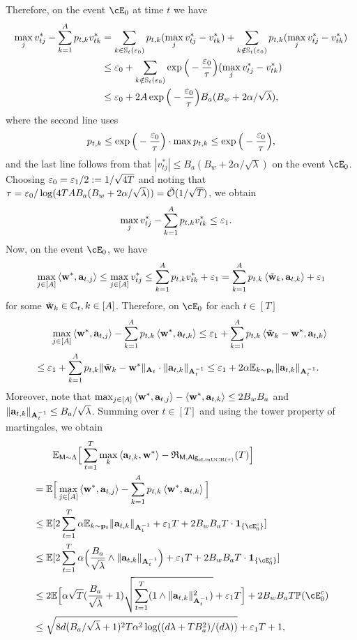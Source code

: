 Therefore, on the event $\cE_0$ at time $t$ we have
\begin{align*}
    \max_{j}v^*_{tj}-\sum_{k=1}^A p_{t,k}v^*_{tk}&= \sum_{k\in{\mathbb{S}}_t(\varepsilon_0)} p_{t,k}(\max_{j}v^*_{tj}-v^*_{tk})+\sum_{k\notin{\mathbb{S}}_t(\varepsilon_0)} p_{t,k}(\max_{j}v^*_{tj}-v^*_{tk})\\
    &\leq \varepsilon_0+\sum_{k\notin{\mathbb{S}}_t(\varepsilon_0)} \exp\Big(-\frac{\varepsilon_0}{{\tau}}\Big)(\max_{j}v^*_{tj}-v^*_{tk})\\
    &\leq \varepsilon_0+2A\exp\Big(-\frac{\varepsilon_0}{{\tau}}\Big)B_a(B_w+2\alpha/\sqrt{\lambda}),
\end{align*}
where the second line uses $$
p_{t,k}\leq\exp\Big(-\frac{\varepsilon_0}{{\tau}}\Big)\cdot\max{p_{t,k}}\leq \exp\Big(-\frac{\varepsilon_0}{{\tau}}\Big),
$$ and the  last line follows from that $|v^*_{tj}|\leq B_a(B_w+2\alpha/\sqrt{\lambda})$
 on the event $\cE_0$. Choosing $\varepsilon_0=\varepsilon_1/2:=1/\sqrt{4T}$ and noting that ${\tau}=\varepsilon_0/\log(4TA B_a(B_w+2\alpha/\sqrt{\lambda}))={\tilde{\mathcal O}}(1/\sqrt{T})$, we obtain
 \begin{align*}
    \max_{j}v^*_{tj}-\sum_{k=1}^A p_{t,k}v^*_{tk}&\leq\varepsilon_1.
\end{align*}
Now, on the event $\cE_0$, we have
\begin{align*}
    \max_{j\in[A]}\left\langle{\mathbf w}^*,{\mathbf a}_{t,j}\right\rangle\leq  \max_{j\in[A]}v^*_{tj}\leq \sum_{k=1}^A p_{t,k}v^*_{tk}+\varepsilon_1 =\sum_{k=1}^A p_{t,k}\left\langle\tilde{{\mathbf w}}_k,{\mathbf a}_{t,k}\right\rangle+\varepsilon_1
\end{align*}
for some $\tilde{{\mathbf w}}_k\in{\mathbb{C}}_t,k\in[A]$.
Therefore,  on $\cE_0$ for  each $t\in[T]$
\begin{align*}
    &~~\quad\max_{j\in[A]}\left\langle{\mathbf w}^*,{\mathbf a}_{t,j}\right\rangle-\sum_{k=1}^Ap_{t,k}\left\langle{\mathbf w}^*,{\mathbf a}_{t,k}\right\rangle
    \leq \varepsilon_1+ \sum_{k=1}^Ap_{t,k}\left\langle\tilde{{\mathbf w}}_k-{\mathbf w}^*,{\mathbf a}_{t,k}\right\rangle
    \\&\leq
    \varepsilon_1+\sum_{k=1}^Ap_{t,k}\|\tilde{{\mathbf w}}_k-{\mathbf w}^*\|_{{\mathbf A}_t}\cdot\|{\mathbf a}_{t,k}\|_{{\mathbf A}^{-1}_t}
    \leq \varepsilon_1+ 2\alpha\mathbb{E}_{k\sim {\mathbf p}_t}\|{\mathbf a}_{t,k}\|_{{\mathbf A}^{-1}_t}.
\end{align*}
 Moreover, note that $ \max_{j\in[A]}\left\langle{\mathbf w}^*,{\mathbf a}_{t,j}\right\rangle-\left\langle{\mathbf w}^*,{\mathbf a}_{t,k}\right\rangle\leq 2B_wB_a$ and $\|{\mathbf a}_{t,k}\|_{{\mathbf A}^{-1}_t}\leq B_a/\sqrt{\lambda}$.
Summing over $t\in[T]$ and using the tower property of martingales, we obtain
\begin{align*}
&\qquad\E_{\inst\sim\prior}\Big[\sum_{t=1}^\totlen\max_{k}\<\ba_{t,k},\bw^*\>-\totreward_{\inst,\sAlg_{\sLinUCB(\temp)}}(\totlen)\Big]\\
&=
\E\Big[\max_{j\in[A]}\<\bw^*,\ba_{t,j}\>-\sum_{k=1}^Ap_{t,k}\<\bw^*,\ba_{t,k}\>
 \Big]
\\
&\leq \E[2\sum_{t=1}^T\alpha\E_{k\sim \bp_t}\|\ba_{t,k}\|_{\bA^{-1}_t}+\eps_1 T +2B_wB_a T\cdot\mathbf{1}_{\{\cE^c_0\}}]\\
   &\leq
\E[2\sum_{t=1}^T\alpha\Big(\frac{B_a}{\sqrt{\lambda}}\wedge\|\ba_{t,k}\|_{\bA^{-1}_t}\Big)+\eps_1 T +2B_wB_a T\cdot\mathbf{1}_{\{\cE^c_0\}}]\\
   &\leq
2\E\Big[\alpha\sqrt{T}(\frac{B_a}{\sqrt{\lambda}}+1)\sqrt{\sum_{t=1}^T(1\wedge\|\ba_{t,k}\|^2_{\bA^{-1}_t})}+\eps_1 T\Big]+2B_wB_a T\P(\cE^c_0)\\
&\leq
\sqrt{8 d({B_a}/{\sqrt{\lambda}}+1)^2T\alpha^2\log((d\lambda+TB_a^2)/(d\lambda))}+\eps_1 T+1,
\end{align*}
